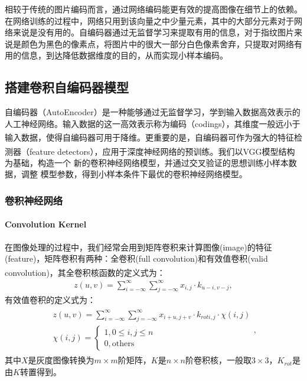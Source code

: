 \documentclass{whutmod}
\newcommand{\upcite}[1]{\textsuperscript{\cite{#1}}}
\begin{document}
\begin{itemize}
			相较于传统的图片编码而言，通过网络编码能更有效的提高图像在细节上的依赖。在网络训练的过程中，网络只用到该向量之中少量元素，其中的大部分元素对于网络来说是没有用的。自编码器通过无监督学习来提取有用的信息，对于指纹图片来说是颜色为黑色的像素点，将图片中的很大一部分白色像素舍弃，只提取对网络有用的信息，到达降低数据维度的目的，从而实现小样本编码。
		
%			
		\subsection{搭建卷积自编码器模型}
		   自编码器（AutoEncoder）是一种能够通过无监督学习，学到输入数据高效表示的人工神经网络。输入数据的这一高效表示称为编码（codings），其维度一般远小于输入数据，使得自编码器可用于降维\upcite{10}。更重要的是，自编码器可作为强大的特征检测器（feature detectors），应用于深度神经网络的预训练。我们以VGG模型\upcite{4}结构为基础，构造一个 新的卷积神经网络模型，并通过交叉验证的思想训练小样本数据，调整
		   模型参数，得到小样本条件下最优的卷积神经网络模型。
		
			\subsubsection{卷积神经网络}
			
			\paragraph{Convolution Kernel} 在图像处理的过程中，我们经常会用到矩阵卷积来计算图像(image)的特征(feature)，矩阵卷积有两种：全卷积(full convolution)和有效值卷积(valid convolution)\upcite{11}，其全卷积核函数的定义式为：
			     \begin{gather}
z(u, v)=\sum_{i=-\infty}^{\infty} \sum_{j=-\infty}^{\infty} x_{i, j} \cdot k_{u-i, v-j},
			     \end{gather}
			有效值卷积的定义式为：
			\begin{gather}
\begin{array}{c}
z(u, v)=\displaystyle\sum_{i=-\infty}^{\infty} \sum_{j=-\infty}^{\infty} x_{i+u, j+v} \cdot k_{r o t i, j} \cdot \chi(i, j) \\
\chi(i, j)=\left\{  
\begin{array}{c}
1,0 \leqslant i, j \leqslant n \\
0, \text {others}
\end{array}
\right.  
\end{array},
			\end{gather}
			其中$X$是灰度图像转换为$m\times m$阶矩阵，$K$是$n\times n$阶卷积核，一般取$3\times 3$，$K_{rot}$是由$K$转置得到。
			

\end{itemize}
\end{document}

